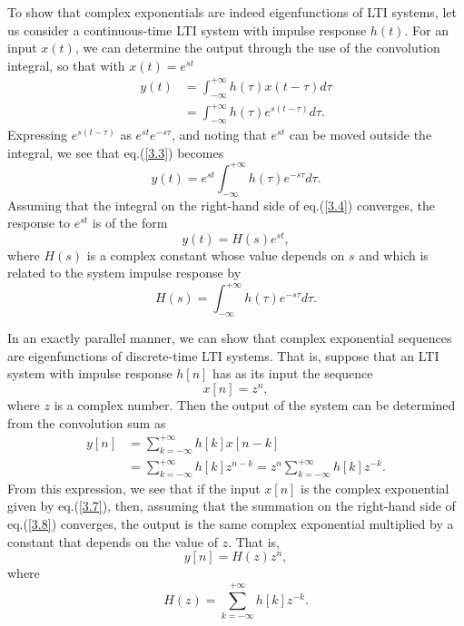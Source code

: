 \documentclass[a4paper,10pt,twoside]{book}
\begin{document}
To show that complex exponentials are indeed eigenfunctions of LTI systems, let us consider a continuous-time LTI system with impulse response $h(t)$. For an input $x(t)$, we can determine the output through the use of the convolution integral, so that with $x(t)=e^{st}$
\begin{equation}
    \begin{aligned}y(t)&=\int_{-\infty}^{+\infty}h(\tau)x(t-\tau) d\tau\\&=\int_{-\infty}^{+\infty}h(\tau)e^{s(t-\tau)} d\tau.\end{aligned}
    \label{3.3}
\end{equation}
Expressing $e^{s(t-\tau)}$ as $e^{st}e^{-s\tau}$, and noting that $e^{st}$ can be moved outside the integral, we see that eq.\;(\ref{3.3}) becomes
\begin{equation}
    y(t) = e^{st}\int_{-\infty}^{+\infty}h(\tau)e^{-s\tau} d\tau.
    \label{3.4}
\end{equation}
Assuming that the integral on the right-hand side of eq.\;(\ref{3.4}) converges, the response to $e^{st}$ is of the form
\begin{equation}
    y(t)=H(s)e^{st},
    \label{3.5}
\end{equation}
where $H(s)$ is a complex constant whose value depends on $s$ and which is related to the system impulse response by
\begin{equation}
    H(s)=\int_{-\infty}^{+\infty}h(\tau)e^{-s\tau} d\tau.
    \label{3.6}
\end{equation}

In an exactly parallel manner, we can show that complex exponential sequences are eigenfunctions of discrete-time LTI systems. That is, suppose that an LTI system with impulse response $h[n]$ has as its input the sequence
\begin{equation}
    x[n]=z^n,
    \label{3.7}
\end{equation}
where $z$ is a complex number. Then the output of the system can be determined from the convolution sum as
\begin{equation}
    \begin{aligned}y[n]&=\sum_{k=-\infty}^{+\infty}h[k]x[n-k]\\&=\sum_{k=-\infty}^{+\infty}h[k]z^{n-k}=z^{n}\sum_{k=-\infty}^{+\infty}h[k]z^{-k}.\end{aligned}
    \label{3.8}
\end{equation}
From this expression, we see that if the input $x[n]$ is the complex exponential given by eq.\;(\ref{3.7}), then, assuming that the summation on the right-hand side of eq.\;(\ref{3.8}) converges, the output is the same complex exponential multiplied by a constant that depends on the value of $z$. That is,
\begin{equation}
    y[n]=H(z)z^n,
    \label{3.9}
\end{equation}
where
\begin{equation}
    H(z)=\sum_{k=-\infty}^{+\infty}h[k]z^{-k}.
    \label{3.10}
\end{equation}
\end{document}
